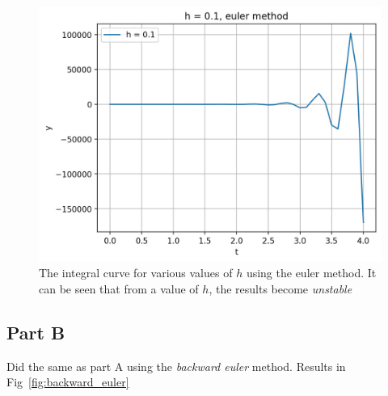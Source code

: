 \documentclass[12pt, a4paper]{article}
\begin{document}
\begin{figure}[h!]
		\includegraphics[width=.45\linewidth]{../p4/results/euler_0.1.jpg}
		\caption{The integral curve for various values of $h$ using the euler method. It can be seen that from a value of $h$, the results become 
			\emph{unstable}}
		\label{fig:euler}
	\end{figure}

	\subsection{Part B}
	Did the same as part A using the \emph{backward euler} method. Results in Fig~\ref{fig:backward_euler}
	
\end{document}
